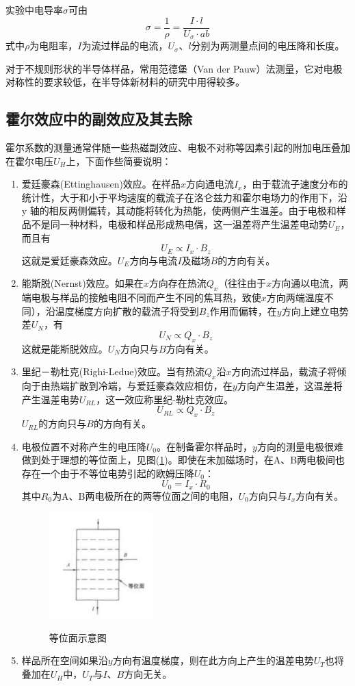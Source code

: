 \documentclass[a4paper]{article}
\begin{document}
实验中电导率$\sigma$可由
\begin{equation}\label{6.1.16}
\sigma=\frac{1}{\rho}=\frac{I\cdot l}{U_\sigma \cdot ab}
\end{equation}
式中$\rho$为电阻率，$I$为流过样品的电流，$U_\sigma$、$l$分别为两测量点间的电压降和长度。

对于不规则形状的半导体样品，常用范德堡（Van der Pauw）法测量，它对电极对称性的要求较低，在半导体新材料的研究中用得较多。

\subsection{霍尔效应中的副效应及其去除}
霍尔系数的测量通常伴随一些热磁副效应、电极不对称等因素引起的附加电压叠加在霍尔电压$U_H$上，下面作些简要说明：
\begin{enumerate}
\item 爱廷豪森(Ettinghausen)效应。在样品$x$方向通电流$I_x$，由于载流子速度分布的统计性，大于和小于平均速度的载流子在洛仑兹力和霍尔电场力的作用下，沿y 轴的相反两侧偏转，其动能将转化为热能，使两侧产生温差。由于电极和样品不是同一种材料，电极和样品形成热电偶，这一温差将产生温差电动势$U_E$，而且有
$$U_E\propto I_x \cdot B_z$$
这就是爱廷豪森效应。$U_E$方向与电流$I$及磁场$B$的方向有关。
\item 能斯脱(Nernst)效应。如果在$x$方向存在热流$Q_x$（往往由于$x$方向通以电流，两端电极与样品的接触电阻不同而产生不同的焦耳热，致使$x$方向两端温度不同），沿温度梯度方向扩散的载流子将受到$B_z$作用而偏转，在$y$方向上建立电势差$U_N$，有
$$U_N \propto Q_x \cdot B_z$$
这就是能斯脱效应。$U_N$方向只与$B$方向有关。
\item 里纪－勒杜克(Righi-Ledue)效应。当有热流$Q_x$沿$x$方向流过样品，载流子将倾向于由热端扩散到冷端，与爱廷豪森效应相仿，在$y$方向产生温差，这温差将产生温差电势$U_{RL}$，这一效应称里纪-勒杜克效应。
$$U_{RL} \propto Q_x \cdot B_z$$
$U_{RL}$的方向只与$B$的方向有关。
\item 电极位置不对称产生的电压降$U_0$。在制备霍尔样品时，$y$方向的测量电极很难做到处于理想的等位面上，见图(\ref{fig4})。即使在未加磁场时，在A、B两电极间也存在一个由于不等位电势引起的欧姆压降$U_0$：
$$U_0= I_x \cdot R_0$$
其中$R_0$为A、B两电极所在的两等位面之间的电阻，$U_0$方向只与$I_x$方向有关。
\begin{figure}[!h]
	\centering
	\includegraphics[width=4cm]{fig/fig4.png}\\
	\caption{等位面示意图}\label{fig4}
\end{figure}
\item 样品所在空间如果沿$y$方向有温度梯度，则在此方向上产生的温差电势$U_T$也将叠加在$U_H$中，$U_T$与$I$、$B$方向无关。
\end{enumerate}
\end{document}
